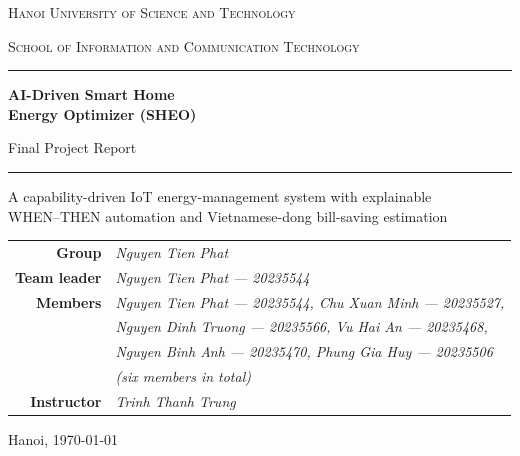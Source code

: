 \documentclass[11pt,a4paper,oneside]{report}
\begin{document}
\begin{titlepage}
\centering
{\scshape\large Hanoi University of Science and Technology\par}
{\scshape School of Information and Communication Technology\par}
\vspace{2.2cm}
{\color{accent}\rule{\linewidth}{1.2pt}}\par\vspace{0.5cm}
{\Huge\bfseries AI-Driven Smart Home\\[0.2cm] Energy Optimizer (SHEO)\par}
\vspace{0.5cm}
{\Large Final Project Report\par}
{\color{accent}\rule{\linewidth}{1.2pt}}\par
\vspace{1.0cm}
{\large A capability-driven IoT energy-management system with explainable\\
WHEN--THEN automation and Vietnamese-dong bill-saving estimation\par}
\vfill
\begin{tabular}{rl}
\textbf{Group} & \textit{Nguyen Tien Phat}\\[2pt]
\textbf{Team leader} & \textit{Nguyen Tien Phat --- 20235544}\\[2pt]
\textbf{Members} & \textit{Nguyen Tien Phat --- 20235544, Chu Xuan Minh --- 20235527,}\\[2pt]
                 & \textit{Nguyen Dinh Truong --- 20235566, Vu Hai An --- 20235468,}\\[2pt]
                 & \textit{Nguyen Binh Anh --- 20235470, Phung Gia Huy --- 20235506}\\[2pt]
                 & \textit{(six members in total)}\\[2pt]
\textbf{Instructor} & \textit{Trinh Thanh Trung}\\
\end{tabular}
\vspace{1.0cm}

{\large Hanoi, \today\par}
\end{titlepage}


\tableofcontents
\listoffigures
\cleardoublepage
{}












\appendix


\end{document}
